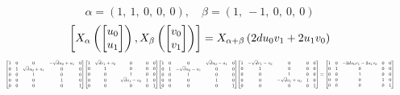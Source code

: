 \documentclass[11pt]{article}
\theoremstyle{definition}
\begin{document}
\[
\alpha = \left( 1, \  1, \  0, \  0, \  0\right), \quad \beta = \left( 1, \  -1, \  0, \  0, \  0\right)
\]
\[
\scaletoalign{\textwidth}{\left[ X_{\alpha}\left(\left[\begin{matrix}u_{0}\\u_{1}\end{matrix}\right]\right), X_{\beta}\left(\left[\begin{matrix}v_{0}\\v_{1}\end{matrix}\right]\right) \right] = X_{\alpha + \beta}\left(2 d u_{0} v_{1} + 2 u_{1} v_{0}\right)}
\]
\[
\scaletoalign{\textwidth}{{\left[\begin{matrix}1 & 0 & 0 & - \sqrt{d} u_{0} + u_{1} & 0\\0 & 1 & \sqrt{d} u_{0} + u_{1} & 0 & 0\\0 & 0 & 1 & 0 & 0\\0 & 0 & 0 & 1 & 0\\0 & 0 & 0 & 0 & 1\end{matrix}\right]} {\left[\begin{matrix}1 & \sqrt{d} v_{1} + v_{0} & 0 & 0 & 0\\0 & 1 & 0 & 0 & 0\\0 & 0 & 1 & 0 & 0\\0 & 0 & \sqrt{d} v_{1} - v_{0} & 1 & 0\\0 & 0 & 0 & 0 & 1\end{matrix}\right]} {\left[\begin{matrix}1 & 0 & 0 & \sqrt{d} u_{0} - u_{1} & 0\\0 & 1 & - \sqrt{d} u_{0} - u_{1} & 0 & 0\\0 & 0 & 1 & 0 & 0\\0 & 0 & 0 & 1 & 0\\0 & 0 & 0 & 0 & 1\end{matrix}\right]} {\left[\begin{matrix}1 & - \sqrt{d} v_{1} - v_{0} & 0 & 0 & 0\\0 & 1 & 0 & 0 & 0\\0 & 0 & 1 & 0 & 0\\0 & 0 & - \sqrt{d} v_{1} + v_{0} & 1 & 0\\0 & 0 & 0 & 0 & 1\end{matrix}\right]} = {\left[\begin{matrix}1 & 0 & - 2 d u_{0} v_{1} - 2 u_{1} v_{0} & 0 & 0\\0 & 1 & 0 & 0 & 0\\0 & 0 & 1 & 0 & 0\\0 & 0 & 0 & 1 & 0\\0 & 0 & 0 & 0 & 1\end{matrix}\right]}}
\]
\end{document}
